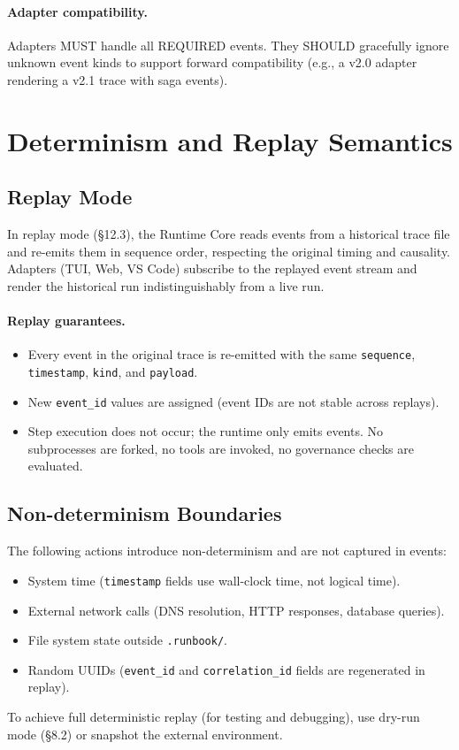 \paragraph{Adapter compatibility.} Adapters MUST handle all REQUIRED events. They SHOULD gracefully ignore unknown event kinds to support forward compatibility (e.g., a v2.0 adapter rendering a v2.1 trace with saga events).

\section{Determinism and Replay Semantics}

\subsection{Replay Mode}

In replay mode (§12.3), the Runtime Core reads events from a historical trace file and re-emits them in sequence order, respecting the original timing and causality. Adapters (TUI, Web, VS Code) subscribe to the replayed event stream and render the historical run indistinguishably from a live run.

\paragraph{Replay guarantees.}
\begin{itemize}
  \item Every event in the original trace is re-emitted with the same \texttt{sequence}, \texttt{timestamp}, \texttt{kind}, and \texttt{payload}.
  \item New \texttt{event\_id} values are assigned (event IDs are not stable across replays).
  \item Step execution does not occur; the runtime only emits events. No subprocesses are forked, no tools are invoked, no governance checks are evaluated.
\end{itemize}

\subsection{Non-determinism Boundaries}

The following actions introduce non-determinism and are not captured in events:
\begin{itemize}
  \item System time (\texttt{timestamp} fields use wall-clock time, not logical time).
  \item External network calls (DNS resolution, HTTP responses, database queries).
  \item File system state outside \texttt{.runbook/}.
  \item Random UUIDs (\texttt{event\_id} and \texttt{correlation\_id} fields are regenerated in replay).
\end{itemize}

To achieve full deterministic replay (for testing and debugging), use dry-run mode (§8.2) or snapshot the external environment.
